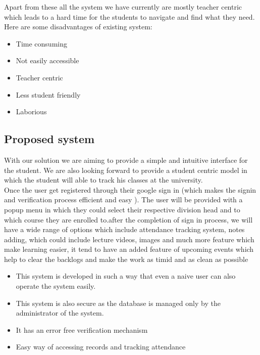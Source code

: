 \documentclass{article}
\begin{document}
\Large
Apart from these all the system we have currently are mostly teacher centric which leads to a hard time for the students to navigate and find what they need.\\

\Large
Here are some disadvantages of existing system:
\begin{itemize}
\item Time consuming
\item Not easily accessible
\item Teacher centric
\item Less student friendly
\item Laborious
\end{itemize}

\vspace{1em}

\subsection{Proposed system}

\Large
With our solution we are aiming to provide a simple and intuitive interface for the student. We are also looking forward to provide a student centric model in which the student will able to track his classes at the university.\\

\Large
Once the user get registered through their google sign in (which makes the signin and verification process efficient and easy ). The user will be provided with a popup menu in which they could select their respective division head and to which course they are enrolled to.after the completion of sign in process, we will have a wide range of options which include attendance tracking system, notes adding, which could include lecture videos, images and much more feature which make learning easier, it tend to have an added feature of upcoming events which help to clear the backlogs and make the work as timid and as clean as possible\\

\begin{itemize}
\item This system is developed in such a way that even a naive user can also operate the system easily.
\item This system is also secure as the database is managed only by
the administrator of the system.
\item It has an error free verification mechanism
\item Easy way of accessing records and tracking attendance
\end{itemize}
\end{document}
